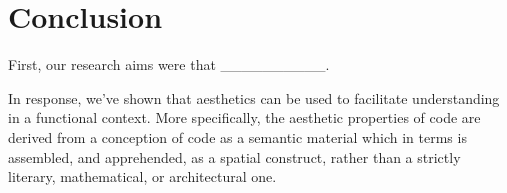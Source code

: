 \chapter{Conclusion} %

%
%




First, our research aims were that __________. %


In response, we've shown that aesthetics can be used to facilitate understanding in a functional context. More specifically, the aesthetic properties of code are derived from a conception of code as a semantic material which in terms is assembled, and apprehended, as a spatial construct, rather than a strictly literary, mathematical, or architectural one.

